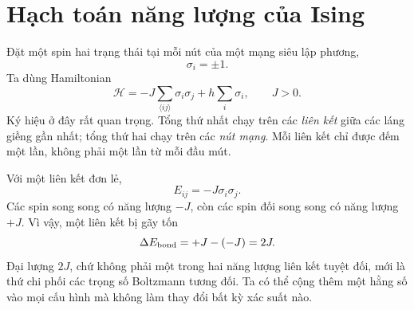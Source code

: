 \section{Hạch toán năng lượng của Ising}

Đặt một spin hai trạng thái tại mỗi nút của một mạng siêu lập phương,
\begin{equation}
\sigma_i=\pm1.
\end{equation}
Ta dùng Hamiltonian
\begin{equation}
\mathcal H
=-J\sum_{\langle ij\rangle}\sigma_i\sigma_j
+h\sum_i\sigma_i,
\qquad J>0.
\label{eq:ising-hamiltonian}
\end{equation}
Ký hiệu ở đây rất quan trọng. Tổng thứ nhất chạy trên các \emph{liên kết} giữa các láng giềng gần nhất; tổng thứ hai chạy trên các \emph{nút mạng}. Mỗi liên kết chỉ được đếm một lần, không phải một lần từ mỗi đầu mút.

Với một liên kết đơn lẻ,
\begin{equation}
E_{ij}=-J\sigma_i\sigma_j.
\end{equation}
Các spin song song có năng lượng \(-J\), còn các spin đối song song có năng lượng \(+J\). Vì vậy, một liên kết bị gãy tốn
\begin{equation}
\Delta E_{\rm bond}=+J-(-J)=2J.
\label{eq:broken-bond}
\end{equation}
Đại lượng \(2J\), chứ không phải một trong hai năng lượng liên kết tuyệt đối, mới là thứ chi phối các trọng số Boltzmann tương đối. Ta có thể cộng thêm một hằng số vào mọi cấu hình mà không làm thay đổi bất kỳ xác suất nào.

\begin{classroomqa}
\end{classroomqa}

\begin{classroomqa}
\end{classroomqa}

